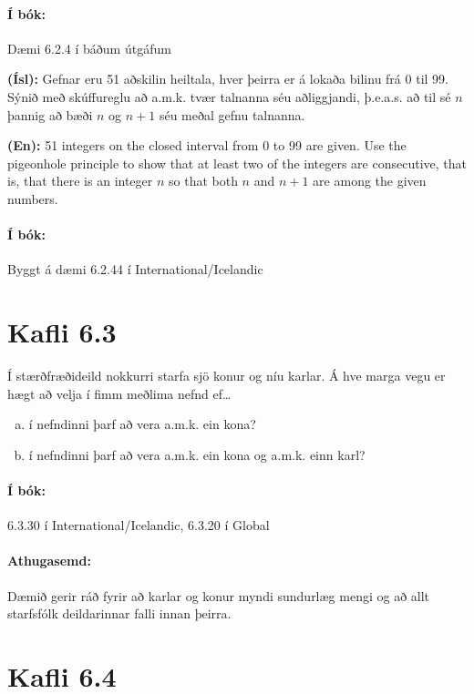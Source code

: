 \documentclass{article}
\begin{document}
\paragraph{Í bók:} Dæmi 6.2.4 í báðum útgáfum

\question 

\textbf{(Ísl):} Gefnar eru 51 aðskilin heiltala, hver þeirra er á lokaða bilinu frá 0 til 99. Sýnið með skúffureglu að a.m.k. tvær talnanna séu aðliggjandi, þ.e.a.s. að til sé $n$ þannig að bæði $n$ og $n+1$ séu meðal gefnu talnanna.

\textbf{(En):} 51 integers on the closed interval from 0 to 99 are given. Use the pigeonhole principle to show that at least two of the integers are consecutive, that is, that there is an integer $n$ so that both $n$ and $n+1$ are among the given numbers.

\paragraph{Í bók:} Byggt á dæmi 6.2.44 í International/Icelandic

\section{Kafli 6.3}

\question

Í stærðfræðideild nokkurri starfa sjö konur og níu karlar. Á hve marga vegu er hægt að velja í fimm meðlima nefnd ef\ldots

\begin{enumerate}[a)]
    \item í nefndinni þarf að vera a.m.k. ein kona?
    \item í nefndinni þarf að vera a.m.k. ein kona og a.m.k. einn karl?
\end{enumerate}

\paragraph{Í bók:} 6.3.30 í International/Icelandic, 6.3.20 í Global

\paragraph{Athugasemd:} Dæmið gerir ráð fyrir að karlar og konur myndi sundurlæg mengi og að allt starfsfólk deildarinnar falli innan þeirra.

\section{Kafli 6.4}
\end{document}
